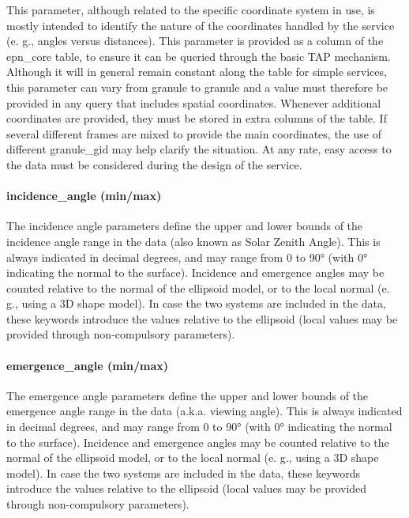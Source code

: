 \documentclass[11pt,a4paper]{ivoa}
\begin{document}
This parameter, although related to the specific coordinate system in use, is mostly intended to identify the nature of the coordinates handled by the service (e. g., angles versus distances). This parameter is provided as a column of the epn\_core table, to ensure it can be queried through the basic TAP mechanism. Although it will in general remain constant along the table for simple services, this parameter can vary from granule to granule and a value must therefore be provided in any query that includes spatial coordinates. Whenever additional coordinates are provided, they must be stored in extra columns of the table. If several different frames are mixed to provide the main coordinates, the use of different granule\_gid may help clarify the situation. At any rate, easy access to the data must be considered during the design of the service. 

\paragraph{incidence\_angle (min/max)}

The incidence angle parameters define the upper and lower bounds of the incidence angle range in the data (also known as Solar Zenith Angle). This is always indicated in decimal degrees, and may range from 0 to 90° (with 0° indicating the normal to the surface). Incidence and emergence angles may be counted relative to the normal of the ellipsoid model, or to the local normal (e. g., using a 3D shape model). In case the two systems are included in the data, these keywords introduce the values relative to the ellipsoid (local values may be provided through non-compulsory parameters).

\paragraph{emergence\_angle (min/max)}

The emergence angle parameters define the upper and lower bounds of the emergence angle range in the data (a.k.a. viewing angle). This is always indicated in decimal degrees, and may range from 0 to 90° (with 0° indicating the normal to the surface). Incidence and emergence angles may be counted relative to the normal of the ellipsoid model, or to the local normal (e. g., using a 3D shape model). In case the two systems are included in the data, these keywords introduce the values relative to the ellipsoid (local values may be provided through non-compulsory parameters).
\end{document}
